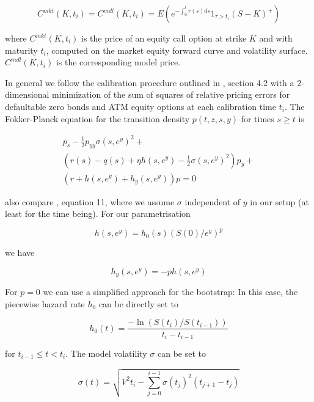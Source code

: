 \begin{equation}\label{formula:convertible_equity_option_match}
C^{mkt}(K,t_i) = C^{mdl}(K,t_i) = E \left( e^{-\int_0^t r(s) ds} 1_{\tau > t_i} (S - K)^+ \right)
\end{equation}

where $C^{mkt}(K,t_i)$ is the price of an equity call option at strike $K$ and with maturity $t_i$, computed on the
market equity forward curve and volatility surface. $C^{mdl}(K,t_i)$ is the corresponding model price.

In general we follow the calibration procedure outlined in \cite{Andersen_Buffum_2002}, section 4.2 with a 2-dimensional
minimization of the sum of squares of relative pricing errors for defaultable zero bonds and ATM equity options at each
calibration time $t_i$. The Fokker-Planck equation for the transition density $p(t,z,s,y)$ for times $s\geq t$ is

\begin{eqnarray}\label{formula:convertible_fokker_planck}
  p_s - \frac{1}{2} p_{yy} \sigma(s,e^y)^2 + \\
        \left( r(s)-q(s)+\eta h(s,e^y)-\frac{1}{2} \sigma(s,e^y)^2 \right) p_y + \\
        \left( r + h(s,e^y) + h_y(s,e^y) \right) p = 0
\end{eqnarray}

also compare \cite{Andersen_Buffum_2002}, equation 11, where we assume $\sigma$ independent of $y$ in our setup (at
  least for the time being). For our parametrisation

\begin{equation}
  h(s,e^y) = h_0(s) ( S(0) / e^y )^p
\end{equation}

we have

\begin{equation}
  h_y(s,e^y) = -p h(s,e^y)
\end{equation}

For $p=0$ we can use a simplified approach for the bootstrap: In this case, the piecewise hazard rate $h_0$ can be
directly set to

\begin{equation}\label{formula:convertible_bondmatch_p0}
  h_0(t) = \frac{ -\ln (S(t_i) / S(t_{i-1}))}{t_i-t_{i-1}}
\end{equation}

for $t_{i-1} \leq t < t_i$. The model volatility $\sigma$ can be set to

\begin{equation}\label{formula:convertible_equitymatch_p0}
  \sigma(t) = \sqrt{ V^2 t_i - \sum_{j=0}^{i-1} \sigma(t_j)^2 (t_{j+1} - t_j) }
\end{equation}

